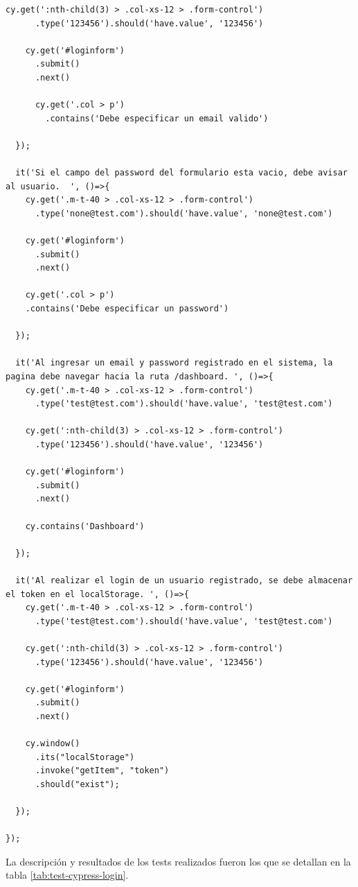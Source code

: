 \begin{lstlisting}[label=cod:test-login-cypress,caption=Código de implementación para tests realizados en la pantalla de login de la plataforma web.]
    cy.get(':nth-child(3) > .col-xs-12 > .form-control')
      .type('123456').should('have.value', '123456')

    cy.get('#loginform')
      .submit()
      .next()

      cy.get('.col > p')
        .contains('Debe especificar un email valido')
  
  });

  it('Si el campo del password del formulario esta vacio, debe avisar al usuario.  ', ()=>{
    cy.get('.m-t-40 > .col-xs-12 > .form-control')
      .type('none@test.com').should('have.value', 'none@test.com')
    
    cy.get('#loginform')
      .submit()
      .next()

    cy.get('.col > p')
    .contains('Debe especificar un password')
      
  });

  it('Al ingresar un email y password registrado en el sistema, la pagina debe navegar hacia la ruta /dashboard. ', ()=>{
    cy.get('.m-t-40 > .col-xs-12 > .form-control')
      .type('test@test.com').should('have.value', 'test@test.com')
    
    cy.get(':nth-child(3) > .col-xs-12 > .form-control')
      .type('123456').should('have.value', '123456')

    cy.get('#loginform')
      .submit()
      .next()

    cy.contains('Dashboard')
  
  });

  it('Al realizar el login de un usuario registrado, se debe almacenar el token en el localStorage. ', ()=>{
    cy.get('.m-t-40 > .col-xs-12 > .form-control')
      .type('test@test.com').should('have.value', 'test@test.com')
    
    cy.get(':nth-child(3) > .col-xs-12 > .form-control')
      .type('123456').should('have.value', '123456')

    cy.get('#loginform')
      .submit()
      .next()

    cy.window()
      .its("localStorage")
      .invoke("getItem", "token")
      .should("exist");
  
  });
  
});

\end{lstlisting}


La descripción y resultados de los tests realizados fueron los que se detallan en la tabla \ref{tab:test-cypress-login}.

